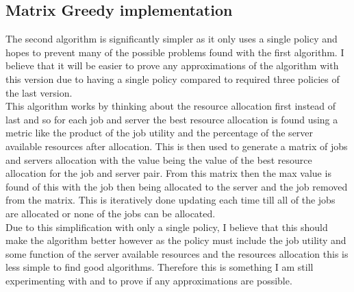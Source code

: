 \subsection{Matrix Greedy implementation}\label{subsec:matrix-greedy-implementation}
The second algorithm is significantly simpler as it only uses a single policy and hopes to prevent many of the possible
problems found with the first algorithm. I believe that it will be easier to prove any approximations of the algorithm
with this version due to having a single policy compared to required three policies of the last version. \\
This algorithm works by thinking about the resource allocation first instead of last and so for each job and server
the best resource allocation is found using a metric like the product of the job utility and the percentage of the server
available resources after allocation. This is then used to generate a matrix of jobs and servers allocation with the value
being the value of the best resource allocation for the job and server pair. From this matrix then the max value is found of this
with the job then being allocated to the server and the job removed from the matrix. This is iteratively done updating each
time till all of the jobs are allocated or none of the jobs can be allocated. \\
Due to this simplification with only a single policy, I believe that this should make the algorithm better however as the
policy must include the job utility and some function of the server available resources and the resources allocation this is
less simple to find good algorithms. Therefore this is something I am still experimenting with and to prove if any
approximations are possible.

